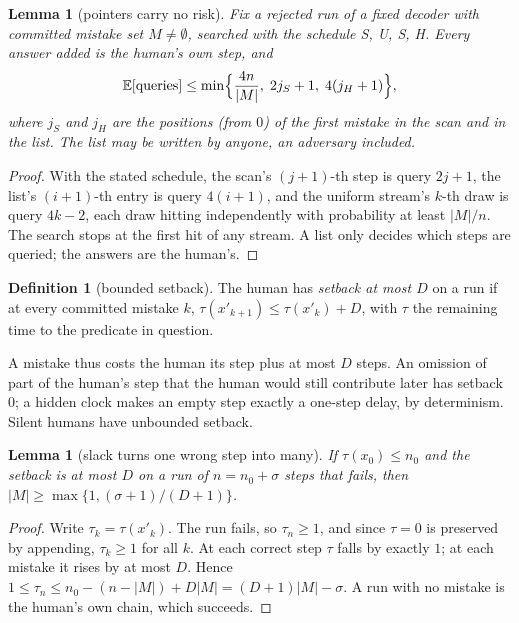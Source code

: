 \documentclass[11pt]{article}
\newtheorem{lemma}[theorem]{Lemma}
\theoremstyle{definition}
\newtheorem{definition}[theorem]{Definition}
\theoremstyle{remark}
\newcommand{\Ex}{\mathbb{E}}
\begin{document}
\begin{lemma}[pointers carry no risk]\label{lem:hints}
Fix a rejected run of a fixed decoder with committed mistake set $M\ne\emptyset$, searched with the schedule S, U, S, H. Every answer added is the human's own step, and
\[ \Ex[\text{queries}] \le \min\Bigl\{\frac{4n}{|M|},\; 2j_S+1,\; 4(j_H+1)\Bigr\}, \]
where $j_S$ and $j_H$ are the positions (from $0$) of the first mistake in the scan and in the list. The list may be written by anyone, an adversary included.
\end{lemma}
\begin{proof}
With the stated schedule, the scan's $(j{+}1)$-th step is query $2j+1$, the list's $(i{+}1)$-th entry is query $4(i+1)$, and the uniform stream's $k$-th draw is query $4k-2$, each draw hitting independently with probability at least $|M|/n$. The search stops at the first hit of any stream. A list only decides which steps are queried; the answers are the human's.
\end{proof}

\begin{definition}[bounded setback]
The human has \emph{setback at most $D$} on a run if at every committed mistake $k$, $\tau(x'_{k+1})\le\tau(x'_k)+D$, with $\tau$ the remaining time to the predicate in question.
\end{definition}

A mistake thus costs the human its step plus at most $D$ steps. An omission of part of the human's step that the human would still contribute later has setback $0$; a hidden clock makes an empty step exactly a one-step delay, by determinism. Silent humans have unbounded setback.

\begin{lemma}[slack turns one wrong step into many]\label{lem:slack}
If $\tau(x_0)\le n_0$ and the setback is at most $D$ on a run of $n=n_0+\sigma$ steps that fails, then $|M|\ge\max\{1,(\sigma+1)/(D+1)\}$.
\end{lemma}
\begin{proof}
Write $\tau_k=\tau(x'_k)$. The run fails, so $\tau_n\ge1$, and since $\tau=0$ is preserved by appending, $\tau_k\ge1$ for all $k$. At each correct step $\tau$ falls by exactly $1$; at each mistake it rises by at most $D$. Hence $1\le\tau_n\le n_0-(n-|M|)+D|M|=(D+1)|M|-\sigma$. A run with no mistake is the human's own chain, which succeeds.
\end{proof}
\end{document}
